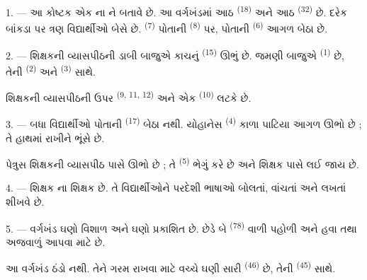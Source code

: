 \VUsaut{2.0mm}
\VUsaut{3.2mm}
\VUsaut{2.6mm}
\VUsaut{3.4mm}
\VUornamento{9pt}
\VUsaut{5.0mm}
\VUsaut{3.0mm}
\VUfilet{16mm}
\VUsaut{5.6mm}

\VUsaut{1.4mm}
\VUsaut{2.2mm}
\VUfilet{20mm}
\VUsaut{6.4mm}

\VUsaut{3.0mm}

1. --- આ કોષ્ટક એક ના ને બતાવે
છે. આ વર્ગખંડમાં આઠ  \textsuperscript{(18)} અને આઠ
 \textsuperscript{(32)} છે. દરેક બાંકડા પર ત્રણ
વિદ્યાર્થીઓ બેસે છે.  \textsuperscript{(7)} પોતાની
 \textsuperscript{(8)} પર, પોતાની 
\textsuperscript{(6)} આગળ બેઠા છે.

2. --- શિક્ષકની વ્યાસપીઠની ડાબી બાજુએ કાચનું 
\textsuperscript{(15)} ઊભું છે. જમણી બાજુએ 
\textsuperscript{(1)} છે, તેની  \textsuperscript{(2)} અને
 \textsuperscript{(3)} સાથે.

શિક્ષકની વ્યાસપીઠની ઉપર  \textsuperscript{(9, 11,
12)} અને એક  \textsuperscript{(10)} લટકે છે.

3. --- બધા વિદ્યાર્થીઓ પોતાની  \textsuperscript{(17)}
બેઠા નથી. યોહાનેસ \textsuperscript{(4)} કાળા પાટિયા આગળ ઊભો છે ; તે
 હાથમાં રાખીને  ભૂંસે છે.

પેત્રુસ શિક્ષકની વ્યાસપીઠ પાસે ઊભો છે ; તે 
\textsuperscript{(5)} ભેગું કરે છે અને શિક્ષક પાસે લઈ જાય છે.

4. ---  શિક્ષક ના શિક્ષક છે. તે
વિદ્યાર્થીઓને પરદેશી ભાષાઓ  બોલતાં, વાંચતાં અને લખતાં શીખવે છે.

5. --- વર્ગખંડ ઘણો વિશાળ અને ઘણો પ્રકાશિત છે. છેડે બે
 \textsuperscript{(78)} વાળી પહોળી  અને
હવા તથા અજવાળું આપવા માટે  છે.

આ વર્ગખંડ ઠંડો નથી. તેને ગરમ રાખવા માટે વચ્ચે ઘણી સારી 
\textsuperscript{(46)} છે, તેની  \textsuperscript{(45)}
સાથે.

